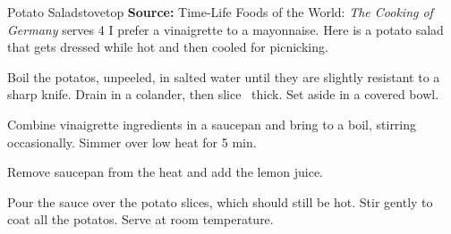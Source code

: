 \begin{recipe}{Potato Salad}{\hfill stovetop \hfill}{\textbf{Source:} Time-Life Foods of the World: \textit{The Cooking of Germany} \hfill serves 4}
  \freeform I prefer a vinaigrette to a mayonnaise. Here is a potato salad that gets dressed while hot and then cooled for picnicking.

Boil the potatos, unpeeled, in salted water until they are slightly resistant to a sharp knife. Drain in a colander, then slice \inch\, thick. Set aside in a covered bowl.

Combine vinaigrette ingredients in a saucepan and bring to a boil, stirring occasionally. Simmer over low heat for 5 min.

Remove saucepan from the heat and add the lemon juice.

\newstep Pour the sauce over the potato slices, which should still be hot. Stir gently to coat all the potatos. Serve at room temperature.
\end{recipe}
